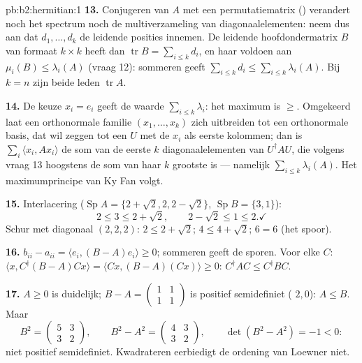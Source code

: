 \begin{solution}{pb:b2:hermitian:1}
\textbf{13.} Conjugeren van $A$ met een permutatiematrix ()
verandert noch het spectrum noch de multiverzameling van
diagonaalelementen: neem dus aan dat $d_1, \dots, d_k$ de leidende
posities innemen. De leidende hoofdondermatrix $B$ van formaat
$k\times k$ heeft dan $\operatorname{tr} B = \sum_{i\leq k}d_i$, en
haar  voldoen aan $\mu_i(B) \leq \lambda_i(A)$ (vraag
12): sommeren geeft $\sum_{i\leq k}d_i \leq \sum_{i\leq
k}\lambda_i(A)$. Bij $k = n$ zijn beide leden $\operatorname{tr}
A$.

\textbf{14.} De keuze $x_i = e_i$ geeft de waarde $\sum_{i\leq
k}\lambda_i$: het maximum is $\geq$. Omgekeerd laat een
orthonormale familie $(x_1, \dots, x_k)$ zich uitbreiden tot een
orthonormale basis, dat wil zeggen tot een  $U$ met de
$x_i$ als eerste kolommen; dan is $\sum_i\langle x_i, Ax_i\rangle$
de som van de eerste $k$ diagonaalelementen van $U^\dagger AU$, die
volgens vraag 13 hoogstens de som van haar $k$ grootste
 is --- namelijk $\sum_{i\leq k}\lambda_i(A)$. Het
maximumprincipe van Ky Fan volgt.

\textbf{15.} Interlacering ($\operatorname{Sp}A = \{2+\sqrt2, 2,
2-\sqrt2\}$, $\operatorname{Sp}B = \{3, 1\}$):
\[
2 \leq 3 \leq 2 + \sqrt2,
\qquad
2 - \sqrt2 \leq 1 \leq 2 . \checkmark
\]
Schur met diagonaal $(2,2,2)$: $2 \leq 2+\sqrt2$; $4 \leq 4 +
\sqrt2$; $6 = 6$ (het spoor). \checkmark

\textbf{16.} $b_{ii} - a_{ii} = \langle e_i, (B-A)e_i\rangle \geq
0$; sommeren geeft de sporen. Voor elke $C$: $\langle x,
C^\dagger(B - A)Cx\rangle = \langle Cx, (B-A)(Cx)\rangle \geq 0$:
$C^\dagger AC \leq C^\dagger BC$.

\textbf{17.} $A \geq 0$ is duidelijk; $B - A = \begin{pmatrix} 1 &
1\\ 1 & 1\end{pmatrix}$ is positief semidefiniet ( $2,
0$): $A \leq B$. Maar
\[
B^2 = \begin{pmatrix} 5 & 3\\ 3 & 2\end{pmatrix},
\qquad
B^2 - A^2 = \begin{pmatrix} 4 & 3\\ 3 & 2\end{pmatrix},
\qquad \det(B^2 - A^2) = -1 < 0 :
\]
niet positief semidefiniet. Kwadrateren eerbiedigt de ordening van
Loewner niet.


\end{solution}
